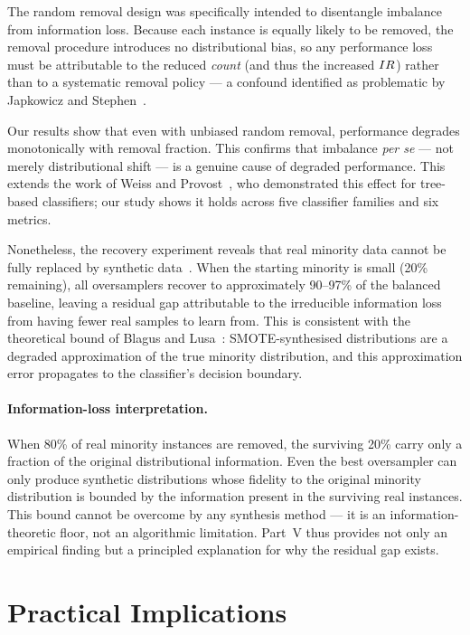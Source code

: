 The random removal design was specifically intended to disentangle imbalance from information loss.
Because each instance is equally likely to be removed, the removal procedure introduces no distributional bias, so any performance loss must be attributable to the reduced \emph{count} (and thus the increased $IR$) rather than to a systematic removal policy --- a confound identified as problematic by Japkowicz and Stephen~\cite{japkowicz2002class}.

Our results show that even with unbiased random removal, performance degrades monotonically with removal fraction.
This confirms that imbalance \emph{per se} --- not merely distributional shift --- is a genuine cause of degraded performance.
This extends the work of Weiss and Provost~\cite{weiss2003effect}, who demonstrated this effect for tree-based classifiers; our study shows it holds across five classifier families and six metrics.

Nonetheless, the recovery experiment reveals that real minority data cannot be fully replaced by synthetic data~\cite{blagus2013smote}.
When the starting minority is small (20\% remaining), all oversamplers recover to approximately 90--97\% of the balanced baseline, leaving a residual gap attributable to the irreducible information loss from having fewer real samples to learn from.
This is consistent with the theoretical bound of Blagus and Lusa~\cite{blagus2013smote}: SMOTE-synthesised distributions are a degraded approximation of the true minority distribution, and this approximation error propagates to the classifier's decision boundary.

\paragraph{Information-loss interpretation.}
When 80\% of real minority instances are removed, the surviving 20\% carry only a fraction of the original distributional information.
Even the best oversampler can only produce synthetic distributions whose fidelity to the original minority distribution is bounded by the information present in the surviving real instances.
This bound cannot be overcome by any synthesis method --- it is an information-theoretic floor, not an algorithmic limitation.
Part~V thus provides not only an empirical finding but a principled explanation for why the residual gap exists.


\section{Practical Implications}
\label{sec:disc:practical}

